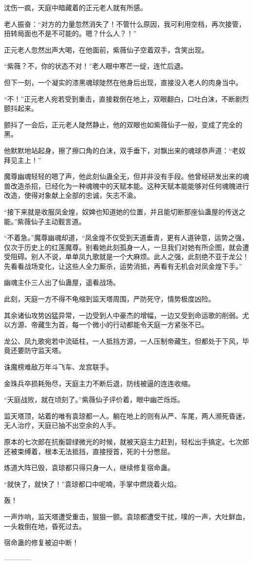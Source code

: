 \begin{this_body}
沈伤一疯，天庭中暗藏着的正元老人就有所感。

老人振奋：“对方的力量忽然消失了！不管什么原因，我可利用空档，再次接管，扭转局面也不是不可能的。嗯？什么人？！”

正元老人忽然出声大喝，在他面前，紫薇仙子空着双手，含笑出现。

“紫薇？不，你的状态不对！”老人眼中寒芒一绽，连忙后退。

但下一刻，一个凝实的漆黑魂球陡然在他身后出现，直接没入老人的肉身当中。

“不！”正元老人宛若受到重击，直接栽倒在地上，双眼翻白，口吐白沫，不断剧烈颤抖起来。

颤抖了一会后，正元老人陡然静止，他的双眼也如紫薇仙子一般，变成了完全的黑。

他默默地站起身，擦了擦口角的白沫，双手垂下，对飘出来的魂球恭声道：“老奴拜见主上！”

魔尊幽魂轻轻的嗯了声，他此刻仙蛊全无，但并非没有手段。他曾经研发出来的魂兽改造杀招，已经化为一种魂魄中的天赋本能。这种天赋本能能够对任何魂魄进行改造，使得对象献上全部的忠诚，矢志不渝。

“接下来就是收服凤金煌，奴婢也知道她的位置，并且能切断那座仙蛊屋的传送之能。”紫薇仙子主动觐言道。

“不着急。”魔尊幽魂却道，“凤金煌不仅受到天道垂青，更有人道钟意，运势之强，仅次于历史上的红莲魔尊。别看她此刻孤身一人，一旦我们对她有所企图，就会遭受阻碍。别人不说，单单凤九歌就是一个大麻烦。此人之强，此刻绝不亚于龙公！先看看战场变化，让这些人全力厮杀，运势消抵，再看有无机会对凤金煌下手。”

幽魂主仆三人出了仙蛊屋，遥看战场。

此刻，天庭一方不得不龟缩到监天塔周围，严防死守，情势极度凶险。

其余诸仙攻势凶猛异常，一边受到人中豪杰的增幅，一边又受到命运歌的削弱。尤以方源、帝藏生为首，每一个微小的行动都能令天庭一方紧张不已。

龙公、凤九歌宛若中流砥柱，一人抵挡方源，一人压制帝藏生，但都处于下风，毕竟还要防守监天塔。

诛魔榜难敌万年斗飞车、龙宫联手。

金珠兵卒损耗殆尽，天庭主力不断后退，防线被逼的连连收缩。

“天庭战败，就在顷刻了。”紫薇仙子评价着，眼中幽芒烁烁。

监天塔顶，站着的唯有袁琼都一人。躺在地上的则有从严、车尾，两人濒死昏迷，无人治疗，天庭已抽不出空余的人手。

原本的七次郎在抗衡碧绿微光的时候，就被天庭主力赶到，轻松出手搞定。七次郎还被束缚着，根本无法抵挡，直接授首，死的十分憋屈。

炼道大阵已毁，袁琼都只得只身一人，继续修复宿命蛊。

“就快了，就快了！”袁琼都口中呢喃，手掌中燃烧着火焰。

轰！

一声炸响，监天塔遭受重击，狠狠一颤。袁琼都遭受干扰，噗的一声，大吐鲜血，一头栽倒在地，昏死过去。

宿命蛊的修复被迫中断！

------------

\end{this_body}


